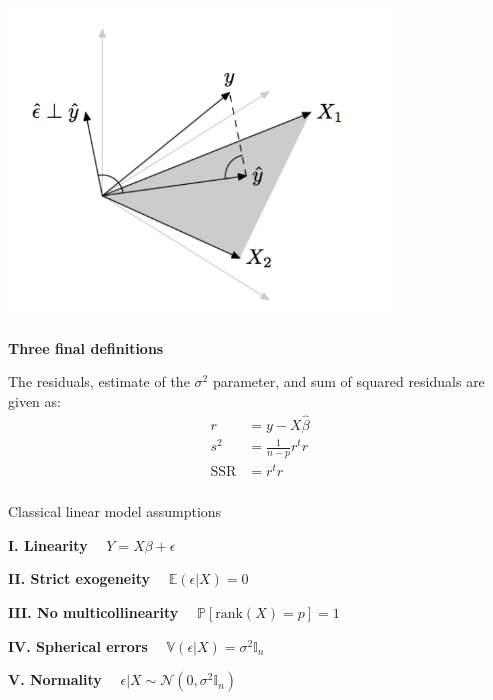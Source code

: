 \begin{frame}[fragile] \frametitle{}

\begin{center}
\includegraphics[width=4in]{img/olsGeom.pdf}
\end{center}

\end{frame}


\begin{frame}[fragile] \frametitle{}

{\bf Three final definitions}

The residuals, estimate of the $\sigma^2$ parameter,
and sum of squared residuals are given as:
\begin{align*}
r &= y - X\widehat{\beta} \\
s^2 &= \frac{1}{n-p} r^t r \\
\text{SSR} &= r^t r
\end{align*}

\end{frame}


\begin{frame}[fragile] \frametitle{}

\begin{center}
{\Large Classical linear model assumptions}
\end{center}

{\bf I. Linearity} $\quad Y = X\beta + \epsilon$

{\bf II. Strict exogeneity} $\quad \mathbb{E} \left( \epsilon | X \right) = 0$

{\bf III. No multicollinearity} $\quad \mathbb{P} \left[ \text{rank} (X) = p \right] = 1$

{\bf IV. Spherical errors} $\quad \mathbb{V} \left( \epsilon | X \right) = \sigma^2 \mathbb{I}_n$

{\bf V. Normality} $\quad \epsilon | X \sim \mathcal{N} (0, \sigma^2 \mathbb{I}_n)$

\end{frame}



